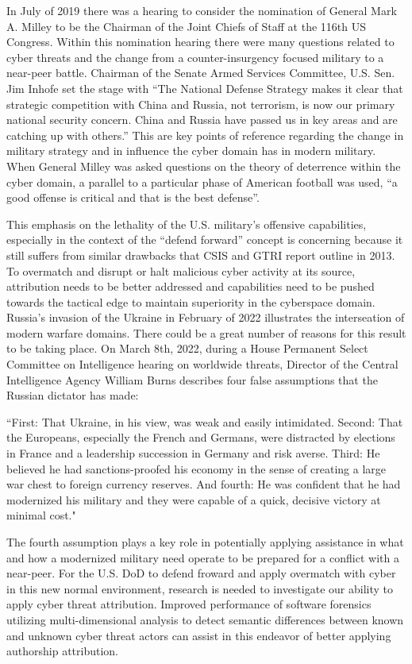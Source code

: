 \documentclass[12pt]{report}
\begin{document}
In July of 2019 there was a hearing to consider the nomination of General Mark A. Milley to be the Chairman of the Joint Chiefs of Staff at the 116th US Congress.  Within this nomination hearing there were many questions related to cyber threats and the change from a counter-insurgency focused military to a near-peer battle.  Chairman of the Senate Armed Services Committee, U.S. Sen. Jim Inhofe set the stage with “The National Defense Strategy makes it clear that strategic competition with China and Russia, not terrorism, is now our primary national security concern.  China and Russia have passed us in key areas and are catching up with others.”  This are key points of reference regarding the change in military strategy and in influence the cyber domain has in modern military.  When General Milley was asked questions on the theory of deterrence within the cyber domain, a parallel to a particular phase of American football was used, “a good offense is critical and that is the best defense”.  

This emphasis on the lethality of the U.S. military’s offensive capabilities, especially in the context of the “defend forward” concept is concerning because it still suffers from similar drawbacks that CSIS and GTRI report outline in 2013.  To overmatch and disrupt or halt malicious cyber activity at its source, attribution needs to be better addressed and capabilities need to be pushed towards the tactical edge to maintain superiority in the cyberspace domain.  Russia’s invasion of the Ukraine in February of 2022 illustrates the interseation of modern warfare domains.  There could be a great number of reasons for this result to be taking place.  On March 8th, 2022, during a House Permanent Select Committee on Intelligence hearing on worldwide threats, Director of the Central Intelligence Agency William Burns describes four false assumptions that the Russian dictator has made:  

“First: That Ukraine, in his view, was weak and easily intimidated. Second: That the Europeans, especially the French and Germans, were distracted by elections in France and a leadership succession in Germany and risk averse. Third: He believed he had sanctions-proofed his economy in the sense of creating a large war chest to foreign currency reserves. And fourth: He was confident that he had modernized his military and they were capable of a quick, decisive victory at minimal cost." 

The fourth assumption plays a key role in potentially applying assistance in what and how a modernized military need operate to be prepared for a conflict with a near-peer.  For the U.S. DoD to defend froward and apply overmatch with cyber in this new normal environment, research is needed to investigate our ability to apply cyber threat attribution.  Improved performance of software forensics utilizing multi-dimensional analysis to detect semantic differences between known and unknown cyber threat actors can assist in this endeavor of better applying authorship attribution.
\end{document}
